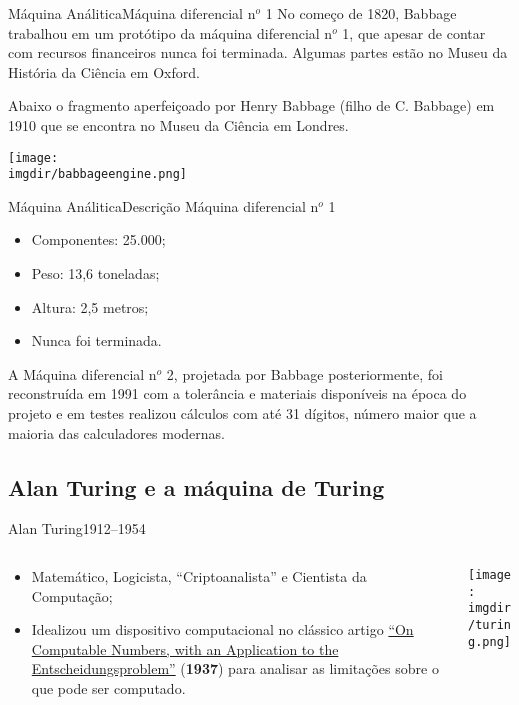 \begin{frame}{Máquina Análitica}{Máquina diferencial n$^o$ 1}
\scriptsize  No começo de 1820, Babbage trabalhou em um protótipo da máquina
  diferencial n$^o$ 1, que apesar de contar com recursos financeiros
  nunca foi terminada. Algumas partes estão no Museu da História da
  Ciência em Oxford.

  \hspace{1cm}Abaixo o fragmento aperfeiçoado por Henry Babbage (filho de
  C. Babbage) em 1910 que se encontra no Museu da Ciência em Londres.
\begin{center}
  \texttt{[image: \\imgdir/babbageengine.png]}
\end{center}
\end{frame}

\begin{frame}{Máquina Análitica}{Descrição}
  Máquina diferencial n$^o$ 1
  \begin{itemize}
  \item Componentes: 25.000;
  \item Peso: 13,6 toneladas;
  \item Altura: 2,5 metros;
  \item Nunca foi terminada.
  \end{itemize}
  \bigskip

  A Máquina diferencial n$^o$ 2, projetada por Babbage posteriormente,
  foi reconstruída em 1991 com a tolerância e materiais disponíveis na
  época do projeto e em testes realizou cálculos com até 31 dígitos,
  número maior que a maioria das calculadores modernas.

\end{frame}

\subsection{Alan Turing e a máquina de Turing}

\begin{frame}{Alan Turing}{1912--1954}

\begin{columns}
\begin{column}{.5\textwidth}
\begin{itemize}
\small
\item Matemático, Logicista, ``Criptoanalista'' e Cientista da
  Computação;
\item Idealizou um dispositivo computacional no clássico artigo
  \href{http://plms.oxfordjournals.org/content/s2-42/1/230.extract}{``On
    Computable Numbers, with an Application to the
    Entscheidungsproblem''} ({\bf 1937}) para analisar as limitações sobre o que
  pode ser computado.
\end{itemize}
\end{column}
\begin{column}{.5\textwidth}
\texttt{[image: \\imgdir/turing.png]}
\end{column}
\end{columns}
\end{frame}

